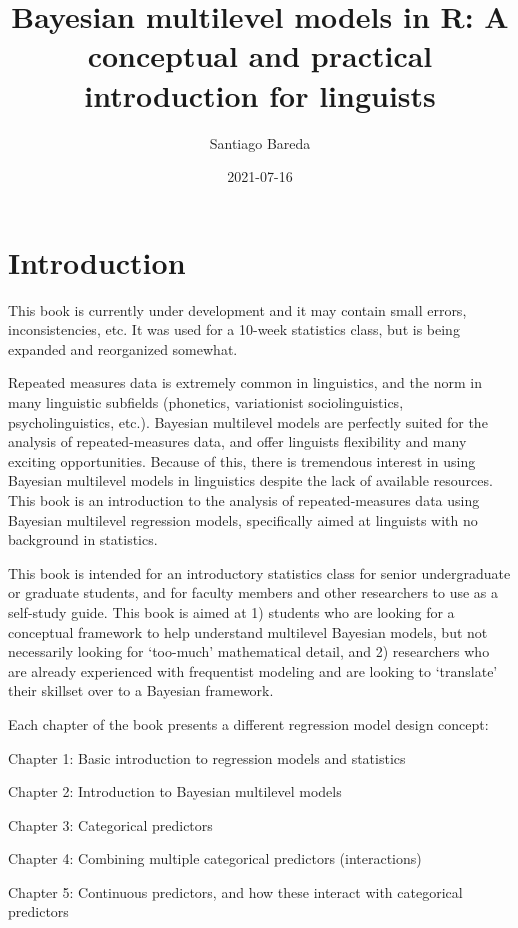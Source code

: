 \documentclass[
]{book}
\title{Bayesian multilevel models in R: A conceptual and practical introduction for linguists}
\author{Santiago Bareda}
\date{2021-07-16}
\begin{document}
\maketitle

{
\setcounter{tocdepth}{1}
\tableofcontents
}
\hypertarget{introduction}{%
\chapter*{Introduction}\label{introduction}}

This book is currently under development and it may contain small errors, inconsistencies, etc. It was used for a 10-week statistics class, but is being expanded and reorganized somewhat.

Repeated measures data is extremely common in linguistics, and the norm in many linguistic subfields (phonetics, variationist sociolinguistics, psycholinguistics, etc.). Bayesian multilevel models are perfectly suited for the analysis of repeated-measures data, and offer linguists flexibility and many exciting opportunities. Because of this, there is tremendous interest in using Bayesian multilevel models in linguistics despite the lack of available resources. This book is an introduction to the analysis of repeated-measures data using Bayesian multilevel regression models, specifically aimed at linguists with no background in statistics.

This book is intended for an introductory statistics class for senior undergraduate or graduate students, and for faculty members and other researchers to use as a self-study guide. This book is aimed at 1) students who are looking for a conceptual framework to help understand multilevel Bayesian models, but not necessarily looking for `too-much' mathematical detail, and 2) researchers who are already experienced with frequentist modeling and are looking to `translate' their skillset over to a Bayesian framework.

Each chapter of the book presents a different regression model design concept:

Chapter 1: Basic introduction to regression models and statistics

Chapter 2: Introduction to Bayesian multilevel models

Chapter 3: Categorical predictors

Chapter 4: Combining multiple categorical predictors (interactions)

Chapter 5: Continuous predictors, and how these interact with categorical predictors
\end{document}
